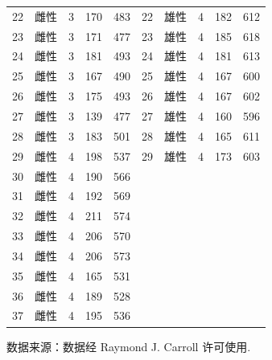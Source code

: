 \begin{mvtable}
\begin{longtable}{ccccc|ccccc}
22 & 雌性 & 3 & 170 & 483 & 22 & 雄性 & 4 & 182 & 612\\
23 & 雌性 & 3 & 171 & 477 & 23 & 雄性 & 4 & 185 & 618\\
24 & 雌性 & 3 & 181 & 493 & 24 & 雄性 & 4 & 181 & 613\\
25 & 雌性 & 3 & 167 & 490 & 25 & 雄性 & 4 & 167 & 600\\
26 & 雌性 & 3 & 175 & 493 & 26 & 雄性 & 4 & 167 & 602\\
27 & 雌性 & 3 & 139 & 477 & 27 & 雄性 & 4 & 160 & 596\\
28 & 雌性 & 3 & 183 & 501 & 28 & 雄性 & 4 & 165 & 611\\
29 & 雌性 & 4 & 198 & 537 & 29 & 雄性 & 4 & 173 & 603\\
30 & 雌性 & 4 & 190 & 566 &  &  &  &  & \\
31 & 雌性 & 4 & 192 & 569 &  &  &  &  & \\
32 & 雌性 & 4 & 211 & 574 &  &  &  &  & \\
33 & 雌性 & 4 & 206 & 570 &  &  &  &  & \\
34 & 雌性 & 4 & 206 & 573 &  &  &  &  & \\
35 & 雌性 & 4 & 165 & 531 &  &  &  &  & \\
36 & 雌性 & 4 & 189 & 528 &  &  &  &  & \\
37 & 雌性 & 4 & 195 & 536 &  &  &  &  & \\
\end{longtable}

\vspace{0.3em}
\noindent 数据来源：数据经 Raymond J. Carroll 许可使用.
\end{mvtable}
